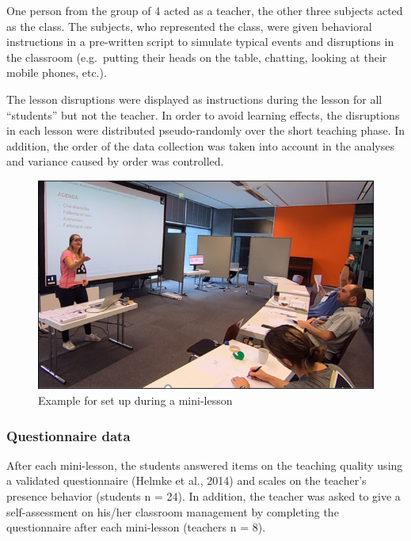 \documentclass[
  english,
  man,floatsintext]{apa6}
\begin{document}
One person from the group of 4 acted as a teacher, the other three subjects acted as the class. The subjects, who represented the class, were given behavioral instructions in a pre-written script to simulate typical events and disruptions in the classroom (e.g.~putting their heads on the table, chatting, looking at their mobile phones, etc.).

The lesson disruptions were displayed as instructions during the lesson for all ``students'' but not the teacher. In order to avoid learning effects, the disruptions in each lesson were distributed pseudo-randomly over the short teaching phase. In addition, the order of the data collection was taken into account in the analyses and variance caused by order was controlled.



\begin{figure}

{\centering \includegraphics{./pictures/datacollection} 

}

\caption{Example for set up during a mini-lesson}\label{fig:datacollection}
\end{figure}

\hypertarget{questionnaire-data}{%
\subsubsection{Questionnaire data}\label{questionnaire-data}}

After each mini-lesson, the students answered items on the teaching quality using a validated questionnaire (Helmke et al., 2014) and scales on the teacher's presence behavior (students n = 24). In addition, the teacher was asked to give a self-assessment on his/her classroom management by completing the questionnaire after each mini-lesson (teachers n = 8).
\end{document}
